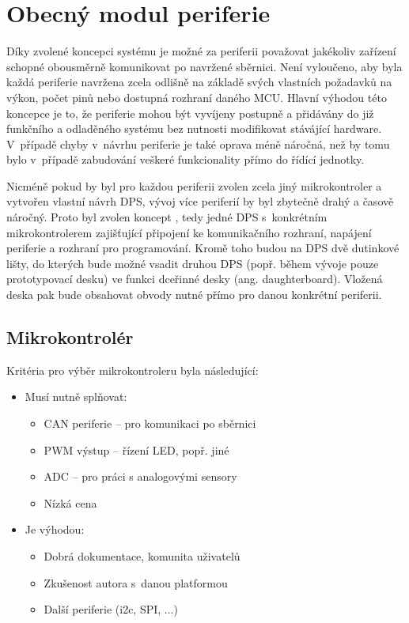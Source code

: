 \chapter{Obecný modul periferie}
\label{sec:modul-periferie}
    Díky zvolené koncepci systému je možné za periferii považovat jakékoliv zařízení schopné obousměrně komunikovat po navržené sběrnici. Není vyloučeno, aby byla každá periferie navržena zcela odlišně na základě svých vlastních požadavků na výkon, počet pinů nebo dostupná rozhraní daného MCU. Hlavní výhodou této koncepce je to, že periferie mohou být vyvíjeny postupně a přidávány do již funkčního a odladěného systému bez nutnosti modifikovat stávájící hardware. V~případě chyby v~návrhu periferie je také oprava méně náročná, než by tomu bylo v~případě zabudování veškeré funkcionality přímo do řídící jednotky. 

    Nicméně pokud by byl pro každou periferii zvolen zcela jiný mikrokontroler a vytvořen vlastní návrh DPS, vývoj více periferií by byl zbytečně drahý a časově náročný. Proto byl zvolen koncept , tedy jedné DPS s~konkrétním mikrokontrolerem zajišťující připojení ke komunikačního rozhraní, napájení periferie a rozhraní pro programování. Kromě toho budou na DPS dvě dutinkové lišty, do kterých bude možné vsadit druhou DPS (popř. během vývoje pouze prototypovací desku) ve funkci dceřinné desky (ang. daughterboard). Vložená deska pak bude obsahovat obvody nutné přímo pro danou konkrétní periferii.
    
    \section{Mikrokontrolér}

        Kritéria pro výběr mikrokontroleru byla následující:
        \begin{itemize}
            \item Musí nutně splňovat:
            \begin{itemize}
                \item CAN periferie -- pro komunikaci po sběrnici 
                \item PWM výstup -- řízení LED, popř. jiné
                \item ADC -- pro práci s analogovými sensory
                \item Nízká cena 
            \end{itemize}
            \item Je výhodou:
            \begin{itemize}
                \item Dobrá dokumentace, komunita uživatelů
                \item Zkušenost autora s~danou platformou
                \item Další periferie (\acs{i2c}, SPI, ...)
            \end{itemize}
        \end{itemize}

